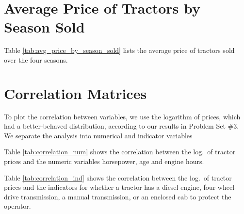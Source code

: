 \documentclass[11pt]{article}
\begin{document}





\section{Average Price of Tractors by Season Sold}

Table \ref{tab:avg_price_by_season_sold} lists the 
average price of tractors sold
over the four seasons. 







\pagebreak
\section{Correlation Matrices}
To plot the correlation between variables, 
we use the logarithm of prices, which had a better-behaved distribution, 
according to our results in Problem Set \#3.
We separate the analysis into numerical and indicator variables 


Table \ref{tab:correlation_num} shows the correlation 
between the log.~of tractor prices
and the numeric variables horsepower, age and engine hours.





Table \ref{tab:correlation_ind} shows the correlation 
between the log.~of tractor prices
and the indicators for whether a tractor
has a diesel engine, four-wheel-drive transmission, a manual transmission, 
or an enclosed cab to protect the operator. 





\end{document}
